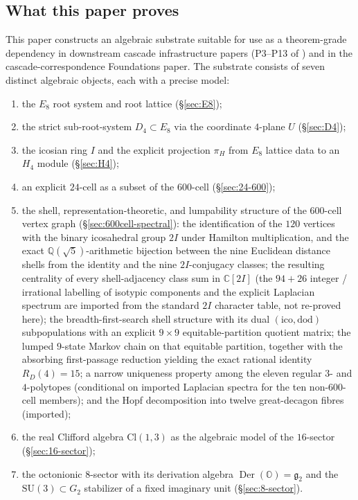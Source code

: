 \documentclass[11pt, a4paper]{amsart}
\theoremstyle{definition}
\newcommand{\Q}{\mathbb{Q}}
\newcommand{\C}{\mathbb{C}}
\newcommand{\OO}{\mathbb{O}}
\newcommand{\Der}{\operatorname{Der}}
\newcommand{\Cl}{\mathrm{Cl}}
\newcommand{\SU}{\mathrm{SU}}
\begin{document}
\subsection{What this paper proves}

This paper constructs an algebraic substrate suitable for use as a
theorem-grade dependency in downstream cascade infrastructure
papers (P3--P13 of \cite{CascadeInfrastructurePlan}) and in the
cascade-correspondence Foundations paper. The substrate consists of
seven distinct algebraic objects, each with a precise model:
\begin{enumerate}
\item the $E_8$ root system and root lattice (\S\ref{sec:E8});
\item the strict sub-root-system $D_4 \subset E_8$ via the
  coordinate $4$-plane $U$ (\S\ref{sec:D4});
\item the icosian ring $I$ and the explicit projection $\pi_H$
  from $E_8$ lattice data to an $H_4$ module (\S\ref{sec:H4});
\item an explicit $24$-cell as a subset of the $600$-cell
  (\S\ref{sec:24-600});
\item the shell, representation-theoretic, and lumpability
  structure of the $600$-cell vertex graph
  (\S\ref{sec:600cell-spectral}): the identification of the $120$
  vertices with the binary icosahedral group $2I$ under Hamilton
  multiplication, and the exact $\Q(\sqrt 5)$-arithmetic bijection
  between the nine Euclidean distance shells from the identity
  and the nine $2I$-conjugacy classes; the resulting centrality
  of every shell-adjacency class sum in $\C[2I]$ (the $94{+}26$
  integer / irrational labelling of isotypic components and the
  explicit Laplacian spectrum are imported from the standard $2I$
  character table, not re-proved here); the breadth-first-search
  shell structure with its dual $(\mathrm{ico}, \mathrm{dod})$
  subpopulations with an explicit $9 \times 9$ equitable-partition
  quotient matrix; the lumped $9$-state Markov chain on that
  equitable partition, together with the absorbing first-passage
  reduction yielding the exact rational identity $R_D(4) = 15$; a narrow uniqueness property among the
  eleven regular $3$- and $4$-polytopes (conditional on imported
  Laplacian spectra for the ten non-$600$-cell members); and the
  Hopf decomposition into twelve great-decagon fibres (imported);
\item the real Clifford algebra $\Cl(1,3)$ as the algebraic model of
  the $16$-sector (\S\ref{sec:16-sector});
\item the octonionic $8$-sector with its derivation algebra
  $\Der(\OO) = \mathfrak{g}_2$ and the $\SU(3) \subset G_2$
  stabilizer of a fixed imaginary unit (\S\ref{sec:8-sector}).
\end{enumerate}
\end{document}
